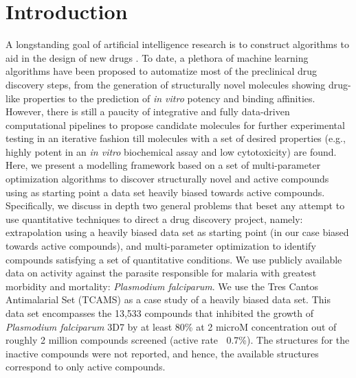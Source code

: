 \documentclass[journal=jacsat,manuscript=article]{achemso}
\begin{document}
\section*{Introduction}
A longstanding goal of artificial intelligence research is to construct algorithms 
to aid in the design of new drugs \cite{Gawehn2016,Chen2018}. 
To date, a plethora of machine learning algorithms have been proposed to automatize most of the preclinical drug discovery steps, from the generation of structurally novel molecules showing drug-like properties\cite{Kang2018} to the prediction of {\it in vitro} potency and binding affinities\cite{Ozturk2018}. However, there is still a paucity of integrative and fully data-driven computational pipelines to propose candidate molecules for further experimental testing in an iterative fashion till molecules with a set of desired properties (e.g., highly potent in an {\it in vitro} biochemical assay and low cytotoxicity) are found. 
\newline
\newline
Here, we present a modelling framework based on a set of multi-parameter optimization algorithms to discover structurally novel and active compounds 
using as starting point a data set heavily biased towards active compounds.
Specifically, we discuss in depth two general problems that beset any attempt to use quantitative techniques to direct a drug discovery project, namely: extrapolation using a heavily biased data set as starting point (in our case biased towards active compounds), and multi-parameter optimization to identify compounds satisfying a set of quantitative conditions.
We use publicly available data on activity against the parasite responsible for malaria with greatest morbidity and mortality: \textit{Plasmodium falciparum}. 
\newline
\newline
We use the Tres Cantos Antimalarial Set (TCAMS) 
as a case study of a heavily biased data set.
This data set encompasses the 13,533 compounds that inhibited the growth of \textit{Plasmodium falciparum} 3D7 by at least 80\% at 2 microM concentration out of roughly 2 million compounds screened (active rate $~$ 0.7\%)\cite{Gamo2010}. The structures for the inactive compounds were not reported, and hence, the available structures correspond to only active compounds.
\end{document}
